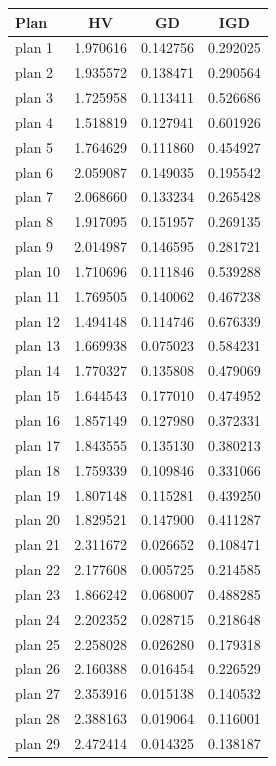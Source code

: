 \begin{table}[h!]
\centering
\begin{tabular}{lccc}
\hline
Plan & HV & GD & IGD \\
\hline
plan 1 & 1.970616 & 0.142756 & 0.292025 \\
plan 2 & 1.935572 & 0.138471 & 0.290564 \\
plan 3 & 1.725958 & 0.113411 & 0.526686 \\
plan 4 & 1.518819 & 0.127941 & 0.601926 \\
plan 5 & 1.764629 & 0.111860 & 0.454927 \\
plan 6 & 2.059087 & 0.149035 & 0.195542 \\
plan 7 & 2.068660 & 0.133234 & 0.265428 \\
plan 8 & 1.917095 & 0.151957 & 0.269135 \\
plan 9 & 2.014987 & 0.146595 & 0.281721 \\
plan 10 & 1.710696 & 0.111846 & 0.539288 \\
plan 11 & 1.769505 & 0.140062 & 0.467238 \\
plan 12 & 1.494148 & 0.114746 & 0.676339 \\
plan 13 & 1.669938 & 0.075023 & 0.584231 \\
plan 14 & 1.770327 & 0.135808 & 0.479069 \\
plan 15 & 1.644543 & 0.177010 & 0.474952 \\
plan 16 & 1.857149 & 0.127980 & 0.372331 \\
plan 17 & 1.843555 & 0.135130 & 0.380213 \\
plan 18 & 1.759339 & 0.109846 & 0.331066 \\
plan 19 & 1.807148 & 0.115281 & 0.439250 \\
plan 20 & 1.829521 & 0.147900 & 0.411287 \\
plan 21 & 2.311672 & 0.026652 & 0.108471 \\
plan 22 & 2.177608 & 0.005725 & 0.214585 \\
plan 23 & 1.866242 & 0.068007 & 0.488285 \\
plan 24 & 2.202352 & 0.028715 & 0.218648 \\
plan 25 & 2.258028 & 0.026280 & 0.179318 \\
plan 26 & 2.160388 & 0.016454 & 0.226529 \\
plan 27 & 2.353916 & 0.015138 & 0.140532 \\
plan 28 & 2.388163 & 0.019064 & 0.116001 \\
plan 29 & 2.472414 & 0.014325 & 0.138187 \\

\end{tabular}
\end{table}
